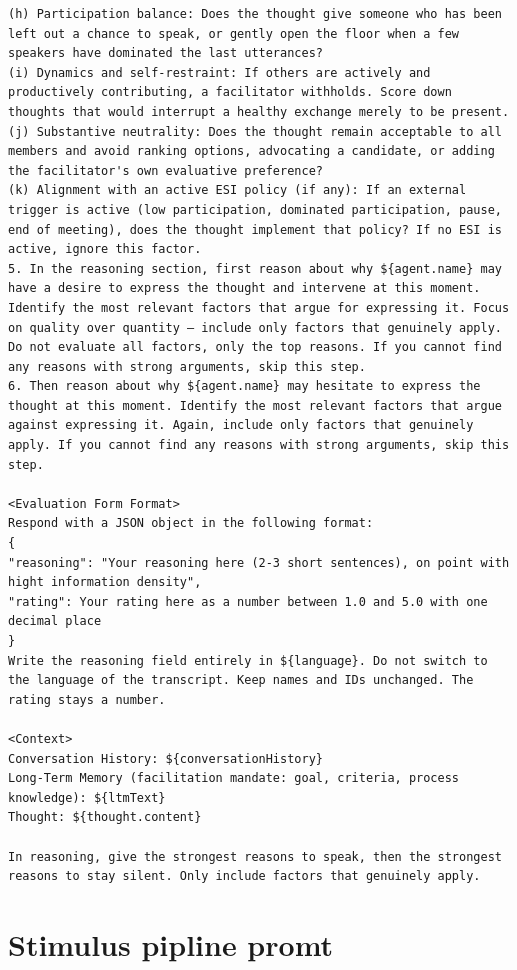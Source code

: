 \begin{verbatim}
(h) Participation balance: Does the thought give someone who has been left out a chance to speak, or gently open the floor when a few speakers have dominated the last utterances?
(i) Dynamics and self-restraint: If others are actively and productively contributing, a facilitator withholds. Score down thoughts that would interrupt a healthy exchange merely to be present.
(j) Substantive neutrality: Does the thought remain acceptable to all members and avoid ranking options, advocating a candidate, or adding the facilitator's own evaluative preference?
(k) Alignment with an active ESI policy (if any): If an external trigger is active (low participation, dominated participation, pause, end of meeting), does the thought implement that policy? If no ESI is active, ignore this factor.
5. In the reasoning section, first reason about why ${agent.name} may have a desire to express the thought and intervene at this moment. Identify the most relevant factors that argue for expressing it. Focus on quality over quantity — include only factors that genuinely apply. Do not evaluate all factors, only the top reasons. If you cannot find any reasons with strong arguments, skip this step.
6. Then reason about why ${agent.name} may hesitate to express the thought at this moment. Identify the most relevant factors that argue against expressing it. Again, include only factors that genuinely apply. If you cannot find any reasons with strong arguments, skip this step.

<Evaluation Form Format>
Respond with a JSON object in the following format:
{
"reasoning": "Your reasoning here (2-3 short sentences), on point with hight information density",
"rating": Your rating here as a number between 1.0 and 5.0 with one decimal place
}
Write the reasoning field entirely in ${language}. Do not switch to the language of the transcript. Keep names and IDs unchanged. The rating stays a number.

<Context>
Conversation History: ${conversationHistory}
Long-Term Memory (facilitation mandate: goal, criteria, process knowledge): ${ltmText}
Thought: ${thought.content}

In reasoning, give the strongest reasons to speak, then the strongest reasons to stay silent. Only include factors that genuinely apply.

\end{verbatim}

\section{Stimulus pipline promt}

